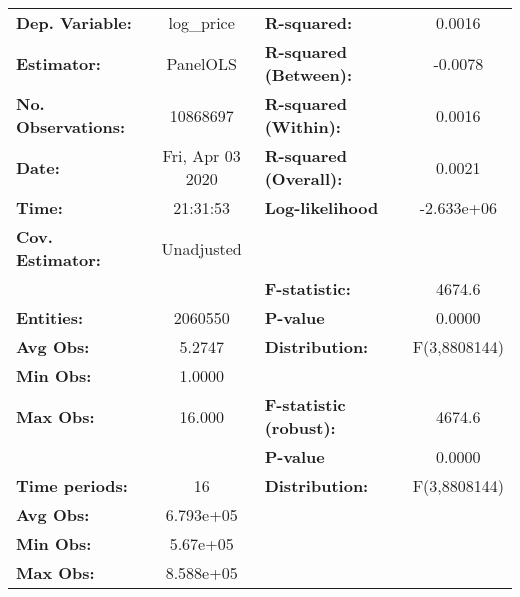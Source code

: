 \documentclass{report}
\begin{document}
\begin{center}
\begin{tabular}{lclc}
\toprule
\textbf{Dep. Variable:}        &     log\_price     & \textbf{  R-squared:         }   &      0.0016      \\
\textbf{Estimator:}            &      PanelOLS      & \textbf{  R-squared (Between):}  &     -0.0078      \\
\textbf{No. Observations:}     &      10868697      & \textbf{  R-squared (Within):}   &      0.0016      \\
\textbf{Date:}                 &  Fri, Apr 03 2020  & \textbf{  R-squared (Overall):}  &      0.0021      \\
\textbf{Time:}                 &      21:31:53      & \textbf{  Log-likelihood     }   &    -2.633e+06    \\
\textbf{Cov. Estimator:}       &     Unadjusted     & \textbf{                     }   &                  \\
\textbf{}                      &                    & \textbf{  F-statistic:       }   &      4674.6      \\
\textbf{Entities:}             &      2060550       & \textbf{  P-value            }   &      0.0000      \\
\textbf{Avg Obs:}              &       5.2747       & \textbf{  Distribution:      }   &   F(3,8808144)   \\
\textbf{Min Obs:}              &       1.0000       & \textbf{                     }   &                  \\
\textbf{Max Obs:}              &       16.000       & \textbf{  F-statistic (robust):} &      4674.6      \\
\textbf{}                      &                    & \textbf{  P-value            }   &      0.0000      \\
\textbf{Time periods:}         &         16         & \textbf{  Distribution:      }   &   F(3,8808144)   \\
\textbf{Avg Obs:}              &     6.793e+05      & \textbf{                     }   &                  \\
\textbf{Min Obs:}              &      5.67e+05      & \textbf{                     }   &                  \\
\textbf{Max Obs:}              &     8.588e+05      & \textbf{                     }   &                  \\
\bottomrule
\end{tabular}
\begin{tabular}{lcccccc}

\end{tabular}
\end{center}
\end{document}
